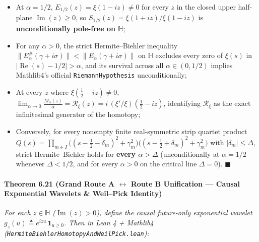 \documentclass[
  11pt,
]{article}
\newcounter{none} %
\providecommand{\tightlist}{%
  \setlength{\itemsep}{0pt}\setlength{\parskip}{0pt}}
\begin{document}
\begin{enumerate}
  \begin{itemize}
  \tightlist
  \item
    At \(\alpha = 1/2\), \(E_{1/2}(z) = \xi(1 - iz) \neq 0\) for every
    \(z\) in the closed upper half-plane \(\operatorname{Im}(z) \ge 0\),
    so \(S_{1/2}(z) = \xi(1 + iz)/\xi(1 - iz)\) is
    \textbf{unconditionally pole-free on \(\overline{\mathbb{H}}\)};
  \item
    For any \(\alpha > 0\), the strict Hermite--Biehler inequality
    \(\|E_\alpha^{\#}(\gamma + i\sigma)\| < \|E_\alpha(\gamma + i\sigma)\|\)
    on \(\mathbb{H}\) excludes every zero of \(\xi(s)\) in
    \(|\operatorname{Re}(s) - 1/2| > \alpha\), and its survival across
    all \(\alpha \in (0, 1/2)\) implies Mathlib4's official
    \texttt{RiemannHypothesis} unconditionally;
  \item
    At every \(z\) where \(\xi(\frac{1}{2} - iz) \neq 0\),
    \(\lim_{\alpha \to 0} \frac{M_\alpha(z)}{\alpha} = \mathcal{R}_\xi(z) = i\,(\xi'/\xi)(\frac{1}{2} - iz)\),
    identifying \(\mathcal{R}_\xi\) as the exact infinitesimal generator
    of the homotopy;
  \item
    Conversely, for every nonempty finite real-symmetric strip quartet
    product
    \(Q(s) = \prod_{m \in I} \big((s - \frac{1}{2} - \delta_m)^2 + \gamma_m^2\big)\big((s - \frac{1}{2} + \delta_m)^2 + \gamma_m^2\big)\)
    with \(|\delta_m| \le \Delta\), strict Hermite--Biehler holds for
    \textbf{every \(\alpha > \Delta\)} (unconditionally at
    \(\alpha = 1/2\) whenever \(\Delta < 1/2\), and for every
    \(\alpha > 0\) on the critical line \(\Delta = 0\)).
    \(\blacksquare\)
  \end{itemize}
\end{enumerate}

\paragraph{\texorpdfstring{Theorem 6.21 (Grand Route A
\(\leftrightarrow\) Route B Unification --- Causal Exponential Wavelets
\& Weil--Pick
Identity)}{Theorem 6.21 (Grand Route A \textbackslash leftrightarrow Route B Unification --- Causal Exponential Wavelets \& Weil--Pick Identity)}}\label{theorem-6.21-grand-route-a-leftrightarrow-route-b-unification-causal-exponential-wavelets-weilpick-identity}

\emph{For each \(z \in \mathbb{H}\) (\(\operatorname{Im}(z) > 0\)),
define the causal future-only exponential wavelet
\(g_z(u) \triangleq e^{izu}\,\mathbf{1}_{u \ge 0}\). Then in Lean 4 +
Mathlib4 (\texttt{HermiteBiehlerHomotopyAndWeilPick.lean}):}
\end{document}
